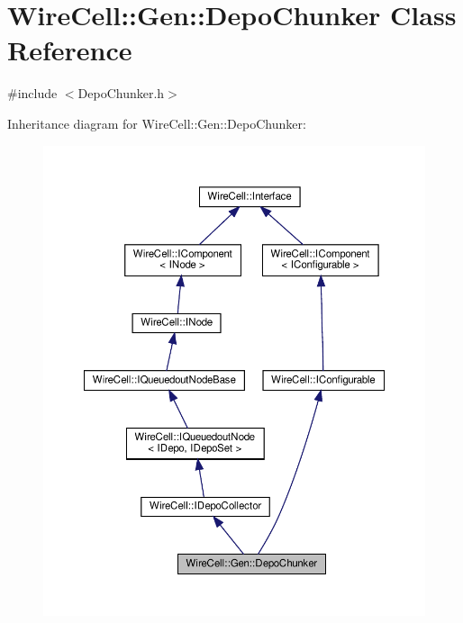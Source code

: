\hypertarget{class_wire_cell_1_1_gen_1_1_depo_chunker}{}\section{Wire\+Cell\+:\+:Gen\+:\+:Depo\+Chunker Class Reference}
\label{class_wire_cell_1_1_gen_1_1_depo_chunker}


{\ttfamily \#include $<$Depo\+Chunker.\+h$>$}



Inheritance diagram for Wire\+Cell\+:\+:Gen\+:\+:Depo\+Chunker\+:
\nopagebreak
\begin{figure}[H]
\begin{center}
\leavevmode
\includegraphics[width=350pt]{class_wire_cell_1_1_gen_1_1_depo_chunker__inherit__graph}
\end{center}
\end{figure}


